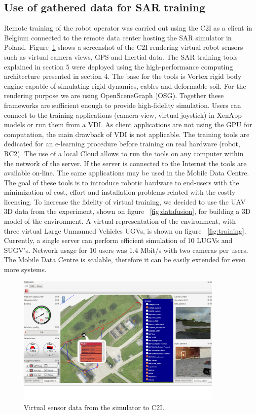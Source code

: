 \documentclass{article}
\begin{document}
\subsection{Use of gathered data for SAR training}

Remote training of the robot operator was carried out using the C2I as a client in Belgium connected to the remote data center hosting the SAR simulator in Poland.
Figure~\ref{fig:c2i_IMMSim_cam} shows a screenshot of the C2I rendering virtual robot sensors such as virtual camera views, GPS and Inertial data.
The SAR training tools explained in section 5 were deployed using the high-performance computing architecture presented in section 4.
The base for the tools is Vortex rigid body engine capable of simulating rigid dynamics, cables and deformable soil.
For the rendering purpose we are using OpenSceneGraph (OSG).
Together these frameworks are sufficient enough to provide high-fidelity simulation.
Users can connect to the training applications (camera view, virtual joystick) in XenApp models or run them from a VDI.
As client applications are not using the GPU for computation, the main drawback of VDI is not applicable.
The training tools are dedicated for an e-learning procedure before training on real hardware (robot, RC2). The use of a local Cloud allows to run the tools on any computer within the network of the server.
If the server is connected to the Internet the tools are available on-line.
The same applications may be used in the Mobile Data Centre.
The goal of these tools is to introduce robotic hardware to end-users with the minimization of cost, effort and installation problems related with the costly licensing.
To increase the fidelity of virtual training, we decided to use the UAV 3D data from the experiment, shown on figure ~\ref{fig:datafusion}, for building a 3D model of the environment.
A virtual representation of the environment, with three virtual Large Unmanned Vehicles UGVs, is shown on figure ~\ref{fig:training}.
Currently, a single server can perform efficient simulation of 10  LUGVs and SUGV's.
Network usage for 10 users was 1.4 Mbit/s with two cameras per users.
The Mobile Data Centre is scalable, therefore it can be easily extended for even more systems.
\begin{figure}
    \centering
    \includegraphics[width=0.9\textwidth]{ROB-15-0035_fig36.png}
    \caption{Virtual sensor data from the simulator to C2I.}
    \label{fig:c2i_IMMSim_cam}
\end{figure}
\end{document}
